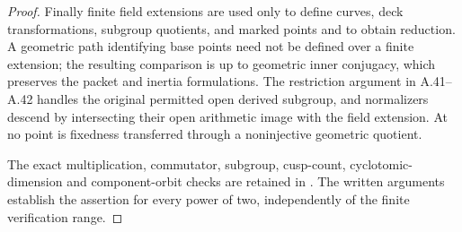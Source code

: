 \begin{proof}
Finally finite field extensions are used only to define
curves, deck transformations, subgroup quotients, and marked
points and to obtain reduction. A geometric path identifying
base points need not be defined over a finite extension;
the resulting comparison is up to geometric inner conjugacy,
which preserves the packet and inertia formulations. The
restriction argument in A.41--A.42 handles the original
permitted open derived subgroup, and normalizers descend by
intersecting their open arithmetic image with the field
extension. At no point is fixedness transferred through a
noninjective geometric quotient.

The exact multiplication, commutator, subgroup, cusp-count,
cyclotomic-dimension and component-orbit checks are retained
in . The written arguments
establish the assertion for every power of two, independently
of the finite verification range.
\end{proof}
